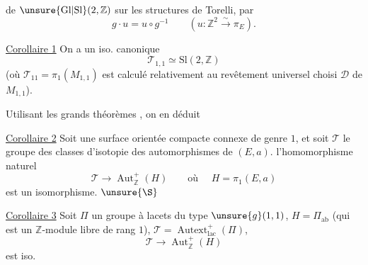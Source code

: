 de $\unsure{\mathrm{Gl}|\mathrm{Sl}}(2,\mathbb Z)$ sur les structures de Torelli, par
\[
g\cdot u=u\circ g^{-1}\qquad
(u:\mathbb Z^2\xrightarrow{\sim}\pi_E).
\]

\uline{Corollaire 1} On a un iso. canonique
\begin{equation}
\mathcal T_{1,1}\simeq\mathrm{Sl}(2,\mathbb Z)
\tag{26}
\end{equation}
(où $\mathcal T_{11}=\pi_1(M_{1,1})$ est calculé relativement au revêtement universel choisi $\mathcal D$ de $M_{1,1}$).

Utilisant les grands théorèmes , on en déduit

\uline{Corollaire 2} Soit  une surface orientée  compacte connexe de genre $1$, et soit $\mathcal T$ le groupe des classes d'isotopie des automorphismes de $(E,a)$.  l'homomorphisme naturel
\begin{equation}
\mathcal T\longrightarrow\operatorname{Aut}_{\mathbb Z}^{+}(H)
\qquad\text{où }\quad H=\pi_1(E,a)
\tag{27}
\end{equation}
est un isomorphisme. $\unsure{\S}$

\uline{Corollaire 3} Soit $\Pi$ un groupe à lacets du type $\unsure{g}(1,1)$, $H=\Pi_{\mathrm{ab}}$ (qui est un $\mathbb Z$-module libre de rang $1$), $\mathcal T=\operatorname{Autext}^{+}_{\mathrm{lac}}(\Pi)$, 
\begin{equation}
\mathcal T\longrightarrow\operatorname{Aut}_{\mathbb Z}^{+}(H)
\tag{28}
\end{equation}
est iso.

